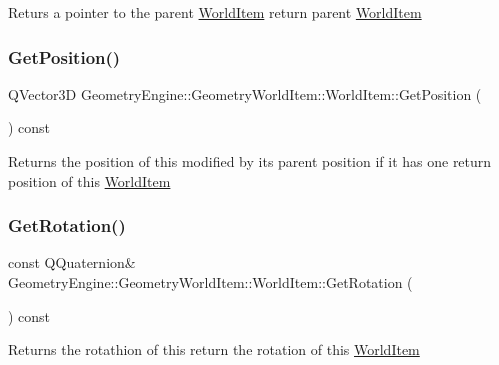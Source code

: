 Returs a pointer to the parent \mbox{\hyperlink{class_geometry_engine_1_1_geometry_world_item_1_1_world_item}{World\+Item}} return parent \mbox{\hyperlink{class_geometry_engine_1_1_geometry_world_item_1_1_world_item}{World\+Item}} \mbox{\label{class_geometry_engine_1_1_geometry_world_item_1_1_world_item_a363a9b807eee91c99264ba1fc9b0e83b}} 
\subsubsection{\texorpdfstring{GetPosition()}{GetPosition()}}
{\footnotesize\ttfamily Q\+Vector3D Geometry\+Engine\+::\+Geometry\+World\+Item\+::\+World\+Item\+::\+Get\+Position (\begin{DoxyParamCaption}{ }\end{DoxyParamCaption}) const}

Returns the position of this modified by its parent position if it has one return position of this \mbox{\hyperlink{class_geometry_engine_1_1_geometry_world_item_1_1_world_item}{World\+Item}} \mbox{\label{class_geometry_engine_1_1_geometry_world_item_1_1_world_item_a34a387b75a951afaf8d73007a59bdf07}} 
\subsubsection{\texorpdfstring{GetRotation()}{GetRotation()}}
{\footnotesize\ttfamily const Q\+Quaternion\& Geometry\+Engine\+::\+Geometry\+World\+Item\+::\+World\+Item\+::\+Get\+Rotation (\begin{DoxyParamCaption}{ }\end{DoxyParamCaption}) const\hspace{0.3cm}{\ttfamily [inline]}}

Returns the rotathion of this return the rotation of this \mbox{\hyperlink{class_geometry_engine_1_1_geometry_world_item_1_1_world_item}{World\+Item}} \mbox{\label{class_geometry_engine_1_1_geometry_world_item_1_1_world_item_a34e1c2617262114189597b1092a2d8ca}} 
